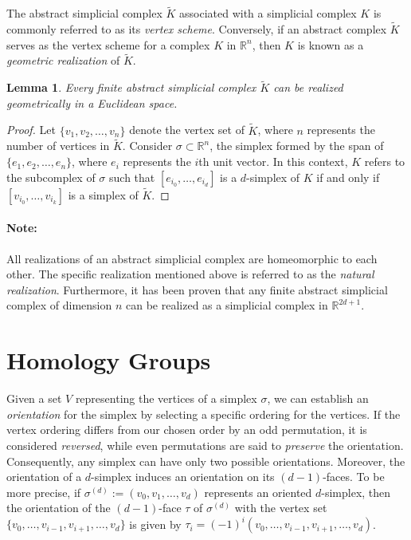 \documentclass{amsart}
\newtheorem{lemma}[definition]{Lemma}
\begin{document}
The abstract simplicial complex $\tilde{K}$ associated with a simplicial complex $K$ is commonly referred to as its \emph{vertex scheme}. Conversely, if an abstract complex $\tilde{K}$ serves as the vertex scheme for a complex $K$ in $\mathbb{R}^n$, then $K$ is known as a \emph{geometric realization} of $\tilde{K}$.

\begin{lemma}
Every finite abstract simplicial complex $\tilde{K}$ can be realized geometrically in a Euclidean space.
\end{lemma}

\begin{proof}
Let $\{v_1,v_2, \ldots, v_n\}$ denote the vertex set of $\tilde{K}$, where $n$ represents the number of vertices in $\tilde{K}$. Consider $\sigma \subset \mathbb{R}^n$, the simplex formed by the span of $\{e_1, e_2, \ldots, e_n\}$, where $e_i$ represents the $i$th unit vector. In this context, $K$ refers to the subcomplex of $\sigma$ such that $[e_{i_0}, \ldots, e_{i_d}]$ is a $d$-simplex of $K$ if and only if $[v_{i_0}, \ldots, v_{i_k}]$ is a simplex of $\tilde{K}$.
\end{proof}

\paragraph{Note:}
All realizations of an abstract simplicial complex are homeomorphic to each other. The specific realization mentioned above is referred to as the \emph{natural realization}. Furthermore, it has been proven that any finite abstract simplicial complex of dimension $n$ can be realized as a simplicial complex in $\mathbb{R}^{2d+1}$.

\section{Homology Groups}
Given a set $V$ representing the vertices of a simplex $\sigma$, we can establish an \emph{orientation} for the simplex by selecting a specific ordering for the vertices. If the vertex ordering differs from our chosen order by an odd permutation, it is considered \emph{reversed}, while even permutations are said to \emph{preserve} the orientation. Consequently, any simplex can have only two possible orientations. Moreover, the orientation of a $d$-simplex induces an orientation on its $(d-1)$-faces. To be more precise, if $\sigma^{(d)} := (v_0, v_1, \ldots, v_d)$ represents an oriented $d$-simplex, then the orientation of the $(d-1)$-face $\tau$ of $\sigma^{(d)}$ with the vertex set $\{v_0,\ldots,v_{i-1},v_{i+1},\ldots,v_d\}$ is given by $\tau_i = (-1)^i (v_0, \ldots,v_{i-1},v_{i+1},\ldots,v_d)$.
\end{document}
